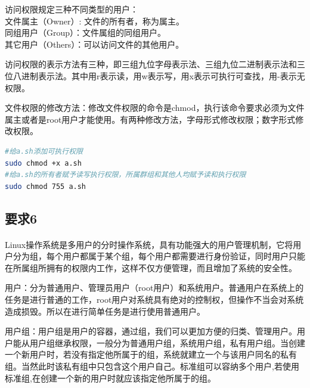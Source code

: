\documentclass[40pt,a4paper，UTF8]{ctexart}
\begin{document}
访问权限规定三种不同类型的用户：
\\文件属主（Owner）: 文件的所有者，称为属主。
\\同组用户（Group）：文件属组的同组用户。
\\其它用户（Others）：可以访问文件的其他用户。


访问权限的表示方法有三种，即三组九位字母表示法、三组九位二进制表示法和三位八进制表示法。其中用r表示读，用w表示写，用x表示可执行可查找，用-表示无权限。

文件权限的修改方法：修改文件权限的命令是chmod，执行该命令要求必须为文件属主或者是root用户才能使用。有两种修改方法，字母形式修改权限；数字形式修改权限。

\begin{lstlisting}[language=bash, caption=更改文件权限的两种方式]
#给a.sh添加可执行权限
sudo chmod +x a.sh   
#给a.sh的所有者赋予读写执行权限，所属群组和其他人均赋予读和执行权限
sudo chmod 755 a.sh 
\end{lstlisting}
\paragraph{}

\subsection{要求6}
\paragraph{}
Linux操作系统是多用户的分时操作系统，具有功能强大的用户管理机制，它将用户分为组，每个用户都属于某个组，每个用户都需要进行身份验证，同时用户只能在所属组所拥有的权限内工作，这样不仅方便管理，而且增加了系统的安全性。

用户：分为普通用户、管理员用户（root用户）和系统用户。普通用户在系统上的任务是进行普通的工作，root用户对系统具有绝对的控制权，但操作不当会对系统造成损毁。所以在进行简单任务是进行使用普通用户。

用户组：用户组是用户的容器，通过组，我们可以更加方便的归类、管理用户。用户能从用户组继承权限，一般分为普通用户组，系统用户组，私有用户组。当创建一个新用户时，若没有指定他所属于的组，系统就建立一个与该用户同名的私有组。当然此时该私有组中只包含这个用户自己。标准组可以容纳多个用户,若使用标准组,在创建一个新的用户时就应该指定他所属于的组。
\paragraph{}
\end{document}
